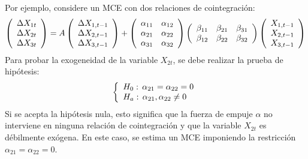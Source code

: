 Por ejemplo, considere un MCE con dos relaciones de cointegraci\'{o}n:
\[
\left( {\begin{array}{*{20}c}
\Delta X_{1t}\\
\Delta X_{2t}\\
\Delta X_{3t}\\
\end{array} } \right)=A\left( {\begin{array}{*{20}c}
\Delta X_{1,t-1}\\
\Delta X_{2,t-1}\\
\Delta X_{3,t-1}\\
\end{array} } \right)+\left( {\begin{array}{*{20}c}
\alpha_{11} & \alpha_{12}\\
\alpha_{21} & \alpha_{22}\\
\alpha_{31} & \alpha_{32}\\
\end{array} } \right)\left( {\begin{array}{*{20}c}
\beta_{11} & \beta_{21} & \beta_{31}\\
\beta_{12} & \beta_{22} & \beta_{32}\\
\end{array} } \right)\left( {\begin{array}{*{20}c}
X_{1,t-1}\\
X_{2,t-1}\\
X_{3,t-1}\\
\end{array} } \right)
\]
Para probar la exogeneidad de la variable $X_{2t}$, se debe realizar la 
prueba de hip\'{o}tesis:
\[
\left\{ {\begin{array}{l}
 H_{0}:\thinspace \alpha_{21}=\alpha_{22}=0 \\ 
 H_{a}:\thinspace \alpha_{21},\alpha_{22}\ne 0\thinspace \thinspace 
\thinspace \thinspace \\ 
 \end{array}} \right.
\]
Si se acepta la hip\'{o}tesis nula, esto significa que la fuerza de empuje 
$\alpha $ no interviene en ninguna relaci\'{o}n de cointegraci\'{o}n y que 
la variable $X_{2t}$ es d\'{e}bilmente ex\'{o}gena. En este caso, se estima 
un MCE imponiendo la restricci\'{o}n $\alpha_{21}=\alpha_{22}=0$.

